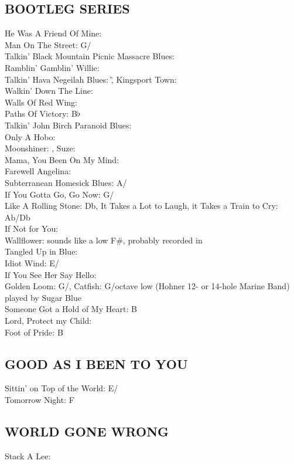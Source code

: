 \documentclass[a4paper,twoside]{memoir}
\begin{document}
\subsection{BOOTLEG SERIES}
He Was A Friend Of Mine: \D\\ Man On The Street: G/\C\\ Talkin' Black Mountain Picnic Massacre Blues: \G\\ Ramblin' Gamblin' Willie: \C\\ Talkin' Hava Negeilah Blues: \G,
Kingsport Town: \C\\ Walkin' Down The Line: \G\\ Walls Of Red Wing: \G\\ Paths Of Victory: B$\flat$\\ Talkin' John Birch Paranoid Blues: \G\\ Only A Hobo: \G\\ Moonshiner: \E,
Suze: \E\\ Mama, You Been On My Mind: \E\\ Farewell Angelina: \G\\ Subterranean Homesick Blues: A/\D\\ If You Gotta Go, Go Now: G/\C\\ Like A Rolling Stone: Db,
It Takes a Lot to Laugh, it Takes a Train to Cry: Ab/Db\\ If Not for You: \G\\ Wallflower: sounds like a low F\#,
probably recorded in \G\\ Tangled Up in Blue: \E\\ Idiot Wind: E/\A\\ If You See Her Say Hello: \E\\ Golden Loom: G/\C,
Catfish: G/octave low \C (Hohner 12- or 14-hole Marine Band) played by
Sugar Blue\\ Someone Got a Hold of My Heart: B\\ Lord, Protect my Child: \G\\ Foot of Pride: B


\subsection{GOOD AS I BEEN TO YOU}
Sittin' on Top of the World: E/\A\\ Tomorrow Night: F


\subsection{WORLD GONE WRONG}
Stack A Lee: \C
\end{document}
